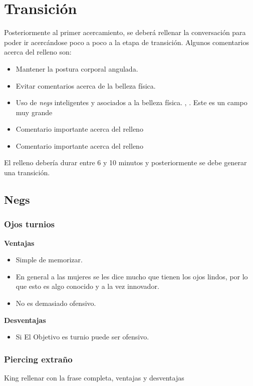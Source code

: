\documentclass{article}
\begin{document}
\section{Transición \label{sec:transicion}}
Posteriormente al primer acercamiento, se deberá rellenar la conversación para poder ir acercándose poco a poco a la etapa de transición. Algunos comentarios acerca del relleno son:

\begin{itemize}
\item Mantener la postura corporal angulada.
\item Evitar comentarios acerca de la belleza física.
\item Uso de \textit{negs} inteligentes y asociados a la belleza física. , . {\color{red} Este es un campo muy grande}
\item {\color{red}Comentario importante acerca del relleno}
\item {\color{red}Comentario importante acerca del relleno}
\end{itemize}
El relleno debería durar entre 6 y 10 minutos y posteriormente se debe generar una transición.
\subsection{Negs\label{sec:negs}}

\subsubsection{Ojos turnios}
\textbf{}

\textbf{Ventajas}
\begin{itemize}
\item Simple de memorizar.
\item En general a las mujeres se les dice mucho que tienen los ojos lindos, por lo que esto es algo conocido y a la vez innovador.
\item No es demasiado ofensivo.
\end{itemize}

\textbf{Desventajas}
\begin{itemize}
\item Si El Objetivo es turnio puede ser ofensivo.
\end{itemize}

\subsubsection{Piercing extraño}
{\color{red}King rellenar con la frase completa, ventajas y desventajas}
\end{document}
